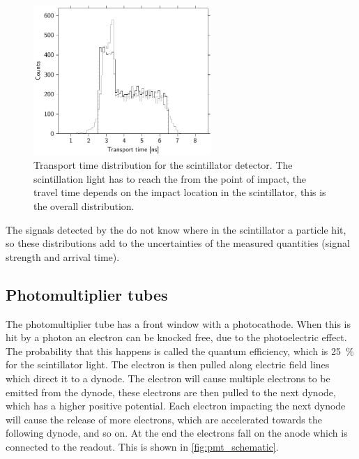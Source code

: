 \begin{figure}
    \centering
    \includegraphics[width=0.6\textwidth]
                    {plots/station/transport_time}
    \caption{Transport time distribution for the scintillator detector. The scintillation light has to reach the \pmt from the point of impact, the travel time depends on the impact location in the scintillator, this is the overall distribution.}
    \label{fig:transport_time}
\end{figure}

The signals detected by the \pmt do not know where in the scintillator a particle hit, so these distributions add to the uncertainties of the measured quantities (signal strength and arrival time).


\subsection{Photomultiplier tubes}

The photomultiplier tube has a front window with a photocathode. When this is hit by a photon an electron can be knocked free, due to the photoelectric effect. The probability that this happens is called the quantum efficiency, which is \SI{25}{\percent} for the scintillator light. The electron is then pulled along electric field lines which direct it to a dynode. The electron will cause multiple electrons to be emitted from the dynode, these electrons are then pulled to the next dynode, which has a higher positive potential. Each electron impacting the next dynode will cause the release of more electrons, which are accelerated towards the following dynode, and so on. At the end the electrons fall on the anode which is connected to the readout. This is shown in \cref{fig:pmt_schematic}.

